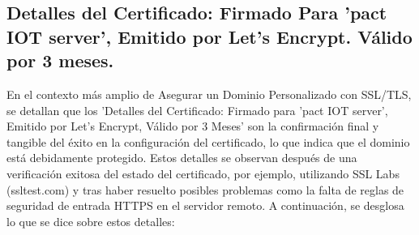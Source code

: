 \documentclass{report}
\begin{document}
\subsection{Detalles del Certificado: Firmado Para 'pact IOT server', Emitido por Let's Encrypt. Válido por 3 meses.}
En el contexto más amplio de Asegurar un Dominio Personalizado con SSL/TLS, se  detallan que los 'Detalles del Certificado: 
Firmado para 'pact IOT server', Emitido por Let's Encrypt, Válido por 3 Meses' son la confirmación final y tangible del éxito en la 
configuración del certificado, lo que indica que el dominio está debidamente protegido. Estos detalles se observan después de una 
verificación exitosa del estado del certificado, por ejemplo, utilizando SSL Labs (ssltest.com) y tras haber resuelto posibles 
problemas como la falta de reglas de seguridad de entrada HTTPS en el servidor remoto.
A continuación, se desglosa lo que se  dice sobre estos detalles:
\end{document}
